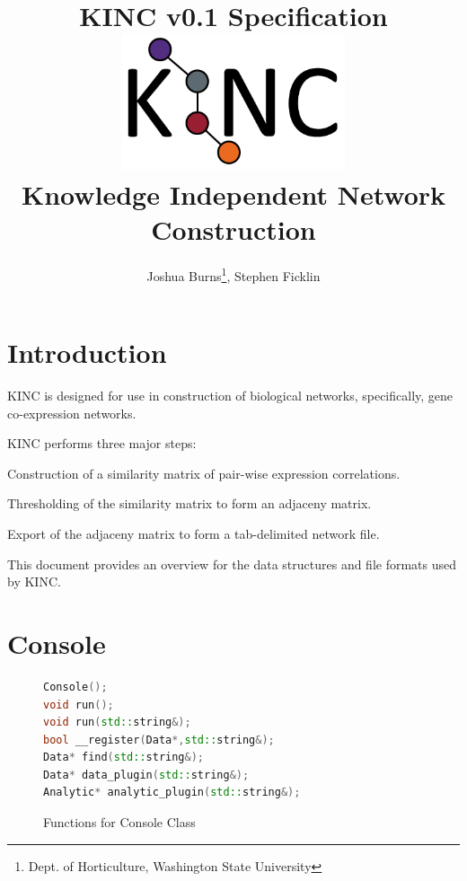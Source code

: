 \documentclass[10pt]{article}
\begin{document}
\title{\textbf{KINC v0.1 Specification}\\
\vspace{1mm}
\includegraphics[width=8cm,height=4cm]{KINClogo.png}
\\Knowledge Independent Network Construction}
\author{Joshua Burns\thanks{Dept. of Horticulture, Washington State 
University}, Stephen Ficklin\footnotemark[1]}
\maketitle

\newpage
\tableofcontents

\newpage
\section{Introduction}

KINC is designed for use in construction of biological networks, specifically, 
gene co-expression networks.

KINC performs three major steps:

\begin{list}{}{}
\item[1)] Construction of a similarity matrix of pair-wise expression 
correlations.
\item[2)] Thresholding of the similarity matrix to form an adjaceny matrix.
\item[3)] Export of the adjaceny matrix to form a tab-delimited network file.
\end{list}

This document provides an overview for the data structures and file formats 
used 
by KINC. 

\newpage
\section{Console}

\begin{figure}[H]
\begin{mdframed}[style=functions]
\begin{lstlisting}[language=C++]
Console();
void run();
void run(std::string&);
bool __register(Data*,std::string&);
Data* find(std::string&);
Data* data_plugin(std::string&);
Analytic* analytic_plugin(std::string&);
\end{lstlisting}
\end{mdframed}
\caption{Functions for Console Class}
\label{fig:console}
\end{figure}
\end{document}
